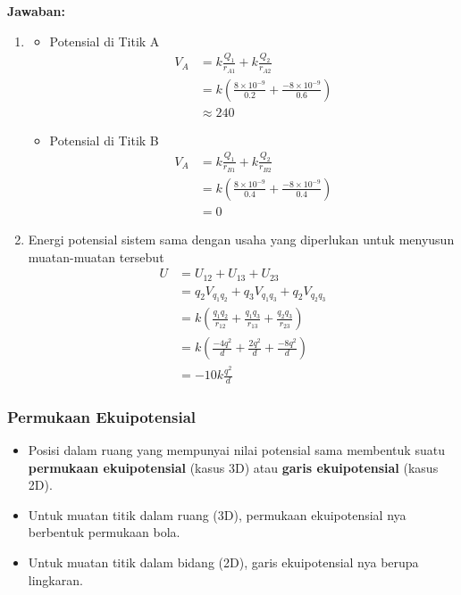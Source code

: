 \documentclass[twocolumn, 11pt]{article}%
\begin{document}
     \textbf{Jawaban:} 
     \begin{enumerate}
         \item 
             \begin{itemize}
                 \item Potensial di Titik A
                     \begin{align*}
                         V_A&=k\frac{Q_1}{r_{A1}}+k\frac{Q_2}{r_{A2}}\\
                            &=k\left(\frac{8\times10^{-9}}{0.2} +\frac{-8\times10^{-9}}{0.6}\right)\\
                            &\approx 240
                     \end{align*}
             \end{itemize}
             \begin{itemize}
                 \item Potensial di Titik B
                     \begin{align*}
                         V_A&=k\frac{Q_1}{r_{B1}}+k\frac{Q_2}{r_{B2}}\\
                            &=k\left(\frac{8\times10^{-9}}{0.4} +\frac{-8\times10^{-9}}{0.4}\right)\\
                            &= 0
                     \end{align*}
             \end{itemize}
        \item 
            Energi potensial sistem sama dengan usaha yang diperlukan untuk menyusun muatan-muatan tersebut
            \begin{align*}
                U&=U_{12}+U_{13}+U_{23}\\
                 &=q_2V_{q_1 q_2}+q_3V_{q_1 q_3}+q_2V_{q_2 q_3}\\
                 &=k\left(\frac{q_1q_2}{r_{12}}+\frac{q_1q_3}{r_{13}}+\frac{q_2q_3}{r_{23}}\right)\\
                 &=k\left(\frac{-4q^2}d + \frac{2q^2}d + \frac{-8q^2}d \right)\\
                 &= -10k\frac{q^2}d
            \end{align*}
     \end{enumerate}

     \subsubsection{Permukaan Ekuipotensial}%
     \begin{itemize}
         \item Posisi dalam ruang yang mempunyai nilai potensial sama membentuk suatu \textbf{permukaan ekuipotensial} (kasus 3D) atau \textbf{garis ekuipotensial} (kasus 2D).
         \item Untuk muatan titik dalam ruang (3D), permukaan ekuipotensial nya berbentuk permukaan bola.
         \item Untuk muatan titik dalam bidang (2D), garis ekuipotensial nya berupa lingkaran.
     \end{itemize}
\end{document}
